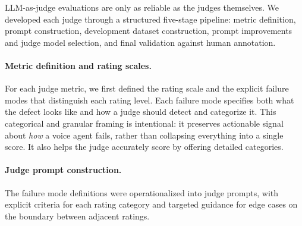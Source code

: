 LLM-as-judge evaluations are only as reliable as the judges themselves.
We developed each judge through a structured five-stage pipeline:
metric definition, prompt construction, development dataset construction,
prompt improvements and judge model selection, and final validation against human annotation.

\paragraph{Metric definition and rating scales.}
For each judge metric, we first defined the rating scale and the explicit
failure modes that distinguish each rating level. Each failure mode
specifies both what the defect looks like and how a judge should detect
and categorize it. This categorical and granular framing is
intentional: it preserves actionable signal about \emph{how} a voice
agent fails, rather than collapsing everything into a single score. It also helps the judge accurately score by offering detailed categories.

\paragraph{Judge prompt construction.}
The failure mode definitions were operationalized into judge prompts,
with explicit criteria for each rating category and targeted guidance for
edge cases on the boundary between adjacent ratings.

